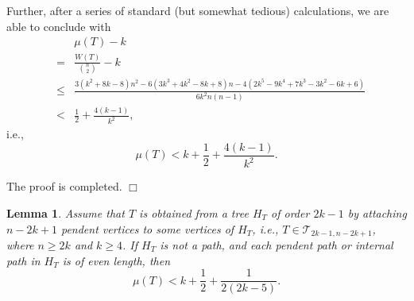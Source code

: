 \documentclass[12pt]{article}
\newtheorem{Lemma}{Lemma}[section]
\newenvironment {Proof} {\noindent {\bf Proof.}}{\hspace*{\fill}$\Box$\par\vspace{4mm}}
\begin{document}
\begin{Proof}
Further,
after a series of standard (but somewhat tedious) calculations, we are able to conclude with
\begin{eqnarray*}
&&\mu (T) - k \\
&=& \frac{W(T)}{\binom{n}{2}} - k \\
&\le& \frac{3 (k^2 + 8k - 8) n^2 - 6 (3k^3 + 4 k^2 - 8k + 8) n - 4 (2 k^5 - 9k ^4 + 7k^3 - 3 k^2 - 6k + 6)}{6k^2 n (n-1)}\\
&<& \frac{1}{2} + \frac{4(k-1)}{k^2},
\end{eqnarray*}
i.e.,
$$
\mu (T) < k + \frac{1}{2} + \frac{4(k-1)}{k^2}.
$$

The proof is completed.
\end{Proof}



\begin{Lemma} \label{le-extra}
Assume that $T$ is obtained from a tree $H_T$ of order $2k-1$ by attaching $n-2k+1$ pendent vertices to some vertices of $H_T$, i.e., $T \in \mathcal{T}_{2k-1,n-2k+1}$, where $n \ge 2k$ and $k \ge 4$. If $H_T$ is not a path, and each pendent path or internal path in $H_T$ is of even length,  then
$$
\mu (T) < k + \frac{1}{2} + \frac{1}{2(2k-5)}.
$$
\end{Lemma}
\end{document}
